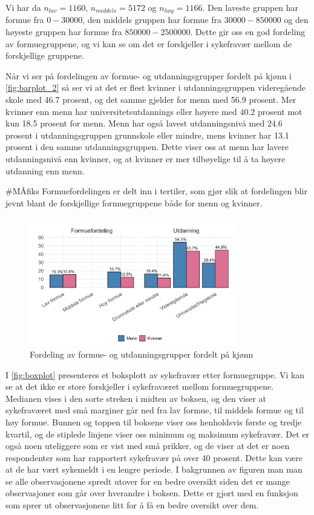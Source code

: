 \documentclass[
  12pt,
  a4paper,
  DIV=11,
  numbers=noendperiod]{scrartcl}
\begin{document}
Vi har da \(n_{lav} = 1160\), \(n_{middels} = 5172\) og
\(n_{høy} = 1166\). Den laveste gruppen har formue fra \(0 - 30000\),
den middels gruppen har formue fra \(30000 - 850000\) og den høyeste
gruppen har formue fra \(850000 - 2500000\). Dette gir oss en god
fordeling av formuegruppene, og vi kan se om det er forskjeller i
sykefravær mellom de forskjellige gruppene.

\newpage

Når vi ser på fordelingen av formue- og utdanningsgrupper fordelt på
kjønn i \autoref{fig:barplot_2} så ser vi at det er flest kvinner i
utdanningsgruppen videregående skole med 46.7 prosent, og det samme
gjelder for menn med 56.9 prosent. Mer kvinner enn menn har
universitetsutdannings eller høyere med 40.2 prosent mot kun 18.5
prosent for menn. Menn har også lavest utdanningsnivå med 24.6 prosent i
utdanningsgruppen grunnskole eller mindre, mens kvinner har 13.1 prosent
i den samme utdanningsgruppen. Dette viser oss at menn har lavere
utdanningsnivå enn kvinner, og at kvinner er mer tilbøyelige til å ta
høyere utdanning enn menn.

\#MÅfiks Formuefordelingen er delt inn i tertiler, som gjør slik at
fordelingen blir jevnt blant de forskjellige formuegruppene både for
menn og kvinner.

\begin{figure}[H]
\caption{Fordeling av formue- og utdanningsgrupper fordelt på kjønn}
\label{fig:barplot_2}
\centering
\includegraphics[width=0.8\textwidth]{dokumentobjekter/figurer/fig_5.png}
\end{figure}

I \autoref{fig:boxplot} presenteres et boksplott av sykefravær etter
formuegruppe. Vi kan se at det ikke er store forskjeller i sykefraværet
mellom formuegruppene. Medianen vises i den sorte streken i midten av
boksen, og den viser at sykefraværet med små marginer går ned fra lav
formue, til middels formue og til høy formue. Bunnen og toppen til
boksene viser oss henholdsvis første og tredje kvartil, og de stiplede
linjene viser oss minimum og maksimum sykefravær. Det er også noen
uteliggere som er vist med små prikker, og de viser at det er noen
respondenter som har rapportert sykefravær på over 40 prosent. Dette kan
være at de har vært sykemeldt i en lengre periode. I bakgrunnen av
figuren man man se alle observasjonene spredt utover for en bedre
oversikt siden det er mange observasjoner som går over hverandre i
boksen. Dette er gjort med en funksjon som sprer ut observasjonene litt
for å få en bedre oversikt over dem.
\end{document}
